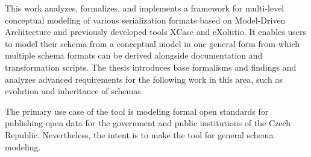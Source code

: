 \documentclass[12pt]{report}
\begin{document}

This work analyzes, formalizes, and implements a framework for multi-level conceptual modeling of various serialization formats based on Model-Driven Architecture and previously developed tools XCase and eXolutio. It enables users to model their schema from a conceptual model in one general form from which multiple schema formats can be derived alongside documentation and transformation scripts. The thesis introduces base formalisms and findings and analyzes advanced requirements for the following work in this area, such as evolution and inheritance of schemas.

The primary use case of the tool is modeling formal open standards for publishing open data for the government and public institutions of the Czech Republic. Nevertheless, the intent is to make the tool for general schema modeling.
\end{document}
